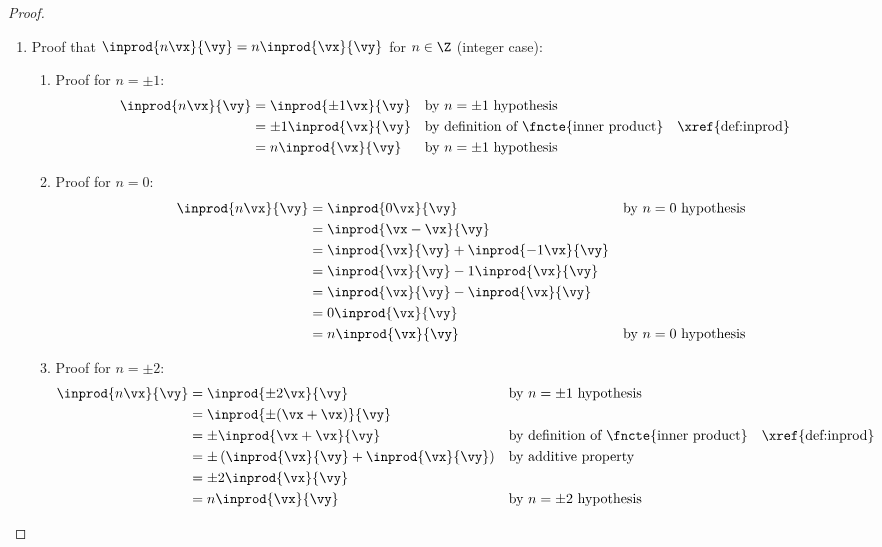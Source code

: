 \begin{proof}
\begin{enumerate}
\begin{enumerate}
\begin{enumerate}
        \item Proof that $\inprod{n\vx}{\vy}=n\inprod{\vx}{\vy}$ for $n\in\Z$ (integer case):
          \begin{enumerate}
            \item Proof for $n=\pm 1$:
              \begin{align*}
                \inprod{n\vx}{\vy}
                  &= \inprod{\pm1\vx}{\vy}
                  && \text{by $n=\pm1$ hypothesis}
                \\&= \pm1\inprod{\vx}{\vy}
                  && \text{by definition of \fncte{inner product}}
                  && \text{\xref{def:inprod}}
                \\&= n\inprod{\vx}{\vy}
                  && \text{by $n=\pm1$ hypothesis}
              \end{align*}

            \item Proof for $n=0$:
              \begin{align*}
                \inprod{n\vx}{\vy}
                  &= \inprod{0\vx}{\vy}
                  && \text{by $n=0$ hypothesis}
                \\&= \inprod{\vx-\vx}{\vy}
                \\&= \inprod{\vx}{\vy} + \inprod{-1\vx}{\vy}
                \\&= \inprod{\vx}{\vy} -1 \inprod{\vx}{\vy}
                \\&= \inprod{\vx}{\vy} - \inprod{\vx}{\vy}
                \\&= 0\inprod{\vx}{\vy}
                \\&= n\inprod{\vx}{\vy}
                  && \text{by $n=0$ hypothesis}
              \end{align*}

            \item Proof for $n=\pm 2$:
              \begin{align*}
                \inprod{n\vx}{\vy}
                  &= \inprod{\pm2\vx}{\vy}
                  && \text{by $n=\pm1$ hypothesis}
                \\&= \inprod{\pm(\vx+\vx)}{\vy}
                \\&= \pm\inprod{\vx+\vx}{\vy}
                  && \text{by definition of \fncte{inner product}}
                  && \text{\xref{def:inprod}}
                \\&= \pm\left(\inprod{\vx}{\vy} + \inprod{\vx}{\vy}\right)
                  && \text{by additive property}
                \\&= \pm2\inprod{\vx}{\vy}
                \\&= n\inprod{\vx}{\vy}
                  && \text{by $n=\pm2$ hypothesis}
              \end{align*}


\end{enumerate}
\end{enumerate}
\end{enumerate}
\end{enumerate}
\end{proof}
